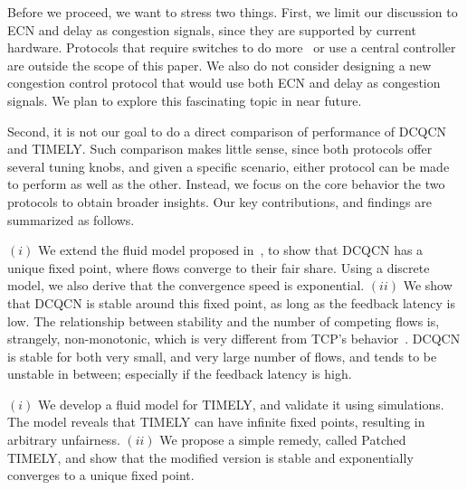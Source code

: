 Before we proceed, we want to stress two things.  First, we limit our discussion
to ECN and delay as congestion signals, since they are supported by current
hardware. Protocols that require switches to do
more~\cite{katabi2002congestion,rcp,pfabric} or use a central
controller~\cite{deadline,perry2014fastpass} are outside the scope of this
paper. We also do not consider designing a new congestion control protocol that
would use both ECN and delay as congestion signals. We plan to explore this
fascinating topic in near future.

Second, it is not our goal to do a direct comparison of performance of DCQCN and
TIMELY.  Such comparison makes little sense, since both protocols offer several
tuning knobs, and given a specific scenario, either protocol can be made to
perform as well as the other. Instead, we focus on the core behavior the two
protocols to obtain broader insights.  Our key contributions, and findings are
summarized as follows.

 $(i)$ We extend the fluid model proposed in~\cite{dcqcn}, to show
that DCQCN has a unique fixed point, where flows converge to their fair share.
Using a discrete model, we also derive that the convergence speed is exponential.
$(ii)$ We show that DCQCN is stable around this fixed point, as long as the
feedback latency is low. The relationship between stability and the number of
competing flows is, strangely, non-monotonic, which is very different from TCP's
behavior~\cite{misra:TAC2002}. DCQCN is stable for both very small, and very
large number of flows, and tends to be unstable in between; especially if the
feedback latency is high.

 $(i)$ We develop a fluid model for TIMELY, and validate it using
simulations. The model reveals that TIMELY can have infinite fixed points,
resulting in arbitrary unfairness.  $(ii)$ We propose a simple remedy, called Patched TIMELY, and show
that the modified version is stable and exponentially converges to a unique fixed 
point. 

